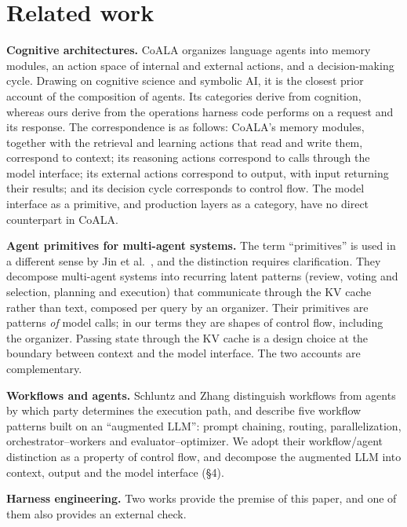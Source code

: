 \section{Related work}

\textbf{Cognitive architectures.} CoALA \cite{sumers2024cognitive} organizes language agents into memory modules, an action space of internal and external actions, and a decision-making cycle. Drawing on cognitive science and symbolic AI, it is the closest prior account of the composition of agents. Its categories derive from cognition, whereas ours derive from the operations harness code performs on a request and its response. The correspondence is as follows: CoALA's memory modules, together with the retrieval and learning actions that read and write them, correspond to context; its reasoning actions correspond to calls through the model interface; its external actions correspond to output, with input returning their results; and its decision cycle corresponds to control flow. The model interface as a primitive, and production layers as a category, have no direct counterpart in CoALA.

\textbf{Agent primitives for multi-agent systems.} The term ``primitives'' is used in a different sense by Jin et al.~\cite{jin2026agentprimitives}, and the distinction requires clarification. They decompose multi-agent systems into recurring latent patterns (review, voting and selection, planning and execution) that communicate through the KV cache rather than text, composed per query by an organizer. Their primitives are patterns \emph{of} model calls; in our terms they are shapes of control flow, including the organizer. Passing state through the KV cache is a design choice at the boundary between context and the model interface. The two accounts are complementary.

\textbf{Workflows and agents.} Schluntz and Zhang \cite{schluntz2024building} distinguish workflows from agents by which party determines the execution path, and describe five workflow patterns built on an ``augmented LLM'': prompt chaining, routing, parallelization, orchestrator--workers and evaluator--optimizer. We adopt their workflow/agent distinction as a property of control flow, and decompose the augmented LLM into context, output and the model interface (§4).

\textbf{Harness engineering.} Two works provide the premise of this paper, and one of them also provides an external check.

